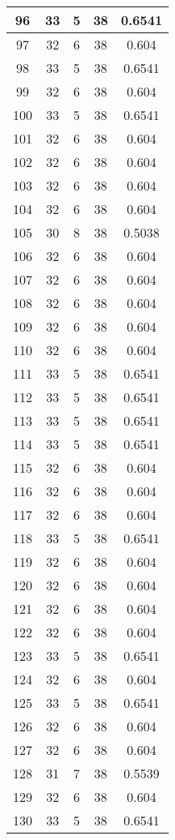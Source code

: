 \documentclass[letterpaper, 12pt]{article}
\begin{document}
\begin{longtable}{|c|c|c|c|c|}
\hline
96 & 33 & 5 & 38 & 0.6541 \\
\hline
97 & 32 & 6 & 38 & 0.604 \\
\hline
98 & 33 & 5 & 38 & 0.6541 \\
\hline
99 & 32 & 6 & 38 & 0.604 \\
\hline
100 & 33 & 5 & 38 & 0.6541 \\
\hline
101 & 32 & 6 & 38 & 0.604 \\
\hline
102 & 32 & 6 & 38 & 0.604 \\
\hline
103 & 32 & 6 & 38 & 0.604 \\
\hline
104 & 32 & 6 & 38 & 0.604 \\
\hline
105 & 30 & 8 & 38 & 0.5038 \\
\hline
106 & 32 & 6 & 38 & 0.604 \\
\hline
107 & 32 & 6 & 38 & 0.604 \\
\hline
108 & 32 & 6 & 38 & 0.604 \\
\hline
109 & 32 & 6 & 38 & 0.604 \\
\hline
110 & 32 & 6 & 38 & 0.604 \\
\hline
111 & 33 & 5 & 38 & 0.6541 \\
\hline
112 & 33 & 5 & 38 & 0.6541 \\
\hline
113 & 33 & 5 & 38 & 0.6541 \\
\hline
114 & 33 & 5 & 38 & 0.6541 \\
\hline
115 & 32 & 6 & 38 & 0.604 \\
\hline
116 & 32 & 6 & 38 & 0.604 \\
\hline
117 & 32 & 6 & 38 & 0.604 \\
\hline
118 & 33 & 5 & 38 & 0.6541 \\
\hline
119 & 32 & 6 & 38 & 0.604 \\
\hline
120 & 32 & 6 & 38 & 0.604 \\
\hline
121 & 32 & 6 & 38 & 0.604 \\
\hline
122 & 32 & 6 & 38 & 0.604 \\
\hline
123 & 33 & 5 & 38 & 0.6541 \\
\hline
124 & 32 & 6 & 38 & 0.604 \\
\hline
125 & 33 & 5 & 38 & 0.6541 \\
\hline
126 & 32 & 6 & 38 & 0.604 \\
\hline
127 & 32 & 6 & 38 & 0.604 \\
\hline
128 & 31 & 7 & 38 & 0.5539 \\
\hline
129 & 32 & 6 & 38 & 0.604 \\
\hline
130 & 33 & 5 & 38 & 0.6541 \\

\end{longtable}
\end{document}
